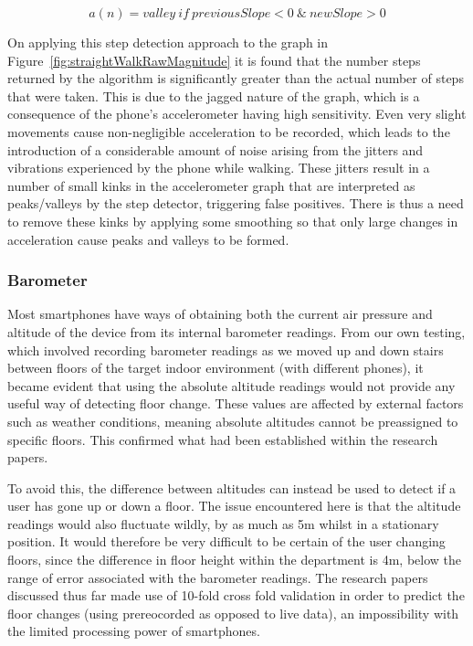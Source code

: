 \documentclass[12pt,a4paper]{report}
\begin{document}
\begin{equation}\label{eq:valleyDetection}
a(n) = valley\ if\ previousSlope < 0\ \&\ newSlope > 0
\end{equation}

On applying this step detection approach to the graph in Figure~\ref{fig:straightWalkRawMagnitude} it is found that the number steps returned by the algorithm is significantly greater than the actual number of steps that were taken. This is due to the jagged nature of the graph, which is a consequence of the phone's accelerometer having high sensitivity. Even very slight movements cause non-negligible acceleration to be recorded, which leads to the introduction of a considerable amount of noise arising from the jitters and vibrations experienced by the phone while walking. These jitters result in a number of small kinks in the accelerometer graph that are interpreted as peaks/valleys by the step detector, triggering false positives. There is thus a need to remove these kinks by applying some smoothing so that only large changes in acceleration cause peaks and valleys to be formed.  

\subsubsection{Barometer}

Most smartphones have ways of obtaining both the current air pressure and altitude of the device from its internal barometer readings. From our own testing, which involved recording barometer readings as we moved up and down stairs between floors of the target indoor environment (with different phones), it became evident that using the absolute altitude readings would not provide any useful way of detecting floor change.
These values are affected by external factors such as weather conditions, meaning absolute altitudes cannot be preassigned to specific floors. This confirmed what had been established within the research papers.

To avoid this, the difference between altitudes can instead be used to detect if a user has gone up or down a floor. The issue encountered here is that the altitude readings would also fluctuate wildly, by as much as 5m whilst in a stationary position. It would therefore be very difficult to be certain of the user changing floors, since the difference in floor height within the department is 4m, below the range of error associated with the barometer readings. The research papers discussed thus far made use of 10-fold cross fold validation in order to predict the floor changes (using prereocorded as opposed to live data), an impossibility with the limited processing power of smartphones.
\end{document}
